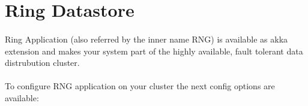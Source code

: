 \section{Ring Datastore}
\paragraph{}
Ring Application (also referred by the inner name RNG) is available as akka extension and makes your system part of the highly available, fault tolerant data distrubution cluster.

\paragraph{}
To configure RNG application on your cluster the next config options are available:


